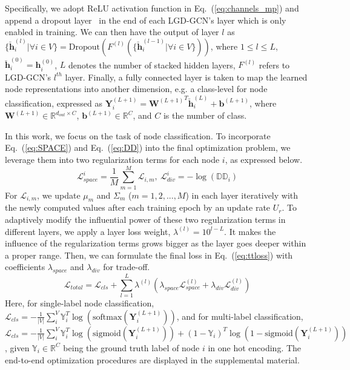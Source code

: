 \documentclass[accepted]{uai2021} %
\begin{document}
Specifically, we adopt ReLU activation function in Eq.~(\ref{eq:channels_mp}) and append a dropout layer~\citep{Srivastava2014DropoutAS} in the end of each LGD-GCN's layer which is only enabled in training. We can then have the output of layer $l$ as $\{\breve{\mathbf{h}}_i^{(l)} | \forall i \in V\} = \text{Dropout}(F^{(l)}(\{\breve{\mathbf{h}}_i^{(l-1)} | \forall i \in V\}))$,
where $1\leq l\leq L$, $\breve{\mathbf{h}}_i^{(0)}=\mathbf{h}_i^{(0)}$, $L$ denotes the number of stacked hidden layers, $F^{(l)}$ refers to LGD-GCN's $l^{th}$ layer. Finally, a fully connected layer is taken to map the learned node representations into another dimension, e.g. a class-level for node classification, expressed as $\mathbf{Y}_i^{(L+1)} = {\mathbf{W}^{(L+1)}}^T\breve{\mathbf{h}}_i^{(L)} + \mathbf{b}^{(L+1)}$, where ${\mathbf{W}^{(L+1)}} \in \mathbb{R}^{d_{out} \times C}$, $\mathbf{b}^{(L+1)} \in \mathbb{R}^{C}$, and $C$ is the number of class. 

In this work, we focus on the task of node classification. To incorporate Eq.~(\ref{eq:SPACE}) and Eq.~(\ref{eq:DD}) into the final optimization problem, we leverage them into two regularization terms for each node $i$, as expressed below.
\begin{equation} \label{eq:reg_losses}
\mathcal{L}_{space}^i = \frac{1}{M}\sum^{M}_{m=1}\mathcal{L}_{i,m},\  \mathcal{L}_{div}^i = -\log(\mathbb{DD}_i)
\end{equation}
For $\mathcal{L}_{i,m}$, we update $\mu_m$ and $\Sigma_m$ ($m=1,2,...,M$) in each layer iteratively with the newly computed values after each training epoch by an update rate $U_r$. To adaptively modify the influential power of these two regularization terms in different layers, we apply a layer loss weight, $\lambda^{(l)} = 10^{l-L}$. It makes the influence of the regularization terms grows bigger as the layer goes deeper within a proper range. Then, we can formulate the final loss in Eq.~(\ref{eq:ttloss}) with coefficients $\lambda_{space}$ and $\lambda_{div}$ for trade-off.
\begin{equation} \label{eq:ttloss}
    \mathcal{L}_{total} = \mathcal{L}_{cls} + \sum_{l=1}^L\lambda^{(l)}(\lambda_{space}\mathcal{L}_{space}^{(l)} + \lambda_{div}\mathcal{L}_{div}^{(l)})
\end{equation}
Here, for single-label node classification, $\mathcal{L}_{cls} = -\frac{1}{|V|}\sum_{i }^V\mathbb{Y}_i^T\log(\text{softmax}(\mathbf{Y}_i^{(L+1)}))$, and for multi-label classification, $\mathcal{L}_{cls} = -\frac{1}{|V|}\sum_{i }^V\mathbb{Y}_i^T\log(\text{sigmoid}(\mathbf{Y}_i^{(L+1)})) + (1-\mathbb{Y}_i)^T\log(1-\text{sigmoid}(\mathbf{Y}_i^{(L+1)}))$, given $\mathbb{Y}_i \in \mathbb{R}^C$ being the ground truth label of node $i$ in one hot encoding. The end-to-end optimization procedures are displayed in the supplemental material.
\end{document}
